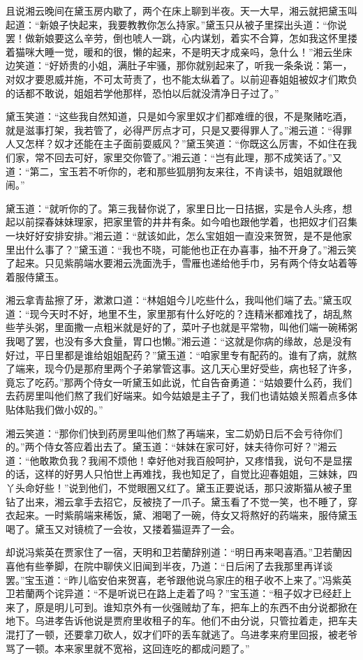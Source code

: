 \documentclass[12pt,oneside]{book}
\begin{document}
且说湘云晚间在黛玉房内歇了，两个在床上聊到半夜。天一大早，湘云就把黛玉叫起道：“新娘子快起来，我要教教你怎么持家。”黛玉只从被子里探出头道：“你说罢！做新娘要这么辛劳，倒也唬人一跳，心内谋划，着实不合算，怎如我这怀里搂着猫咪大睡一觉，暖和的很，懒的起来，不是明天才成亲吗，急什么！”湘云坐床边笑道：“好娇贵的小姐，满肚子牢骚，那你就别起来了，听我一条条说：第一，对奴才要恩威并施，不可太苛责了，也不能太纵着了。以前迎春姐姐被奴才们欺负的话都不敢说，姐姐若学他那样，恐怕以后就没清净日子过了。”

黛玉笑道：“这些我自然知道，只是如今家里奴才们都难缠的很，不是聚赌吃酒，就是滋事打架，我若管了，必得严厉点才可，只是又要得罪人了。”湘云道：“得罪人又怎样？奴才还能在主子面前耍威风？”黛玉笑道：“你既这么厉害，不如住在我们家，常不回去可好，家里交你管了。”湘云道：“岂有此理，那不成笑话了。”又道：“第二，宝玉若不听你的，老和那些狐朋狗友来往，不肯读书，姐姐就跟他闹。”

黛玉道：“就听你的了。第三我替你说了，家里日比一日拮据，实是令人头疼，想起以前探春妹妹理家，把家里管的井井有条。如今咱也跟他学着，也把奴才们召集一块好好安排安排。”湘云道：“就该如此，怎么宝姐姐一直没来贺贺，是不是他家里出什么事了？”黛玉道：“我也不晓，可能他也正在办喜事，抽不开身了。”湘云笑了起来。只见紫鹃端水要湘云洗面洗手，雪雁也递给他手巾，另有两个侍女站着等着服侍黛玉。

湘云拿青盐擦了牙，漱漱口道：“林姐姐今儿吃些什么，我叫他们端了去。”黛玉叹道：“现今天时不好，地里不生，家里那有什么好吃的？连精米都难找了，胡乱熬些芋头粥，里面撒一点粗米就是好的了，菜叶子也就是平常物，叫他们端一碗稀粥我喝了罢，也没有多大食量，胃口也懒。”湘云道：“这就是你病的缘故，总是没有好过，平日里都是谁给姐姐配药？”黛玉道：“咱家里专有配药的。谁有了病，就熬了端来，现今仍是那府里两个子弟掌管这事。这几天心里好受些，病也轻了许多，竟忘了吃药。”那两个侍女一听黛玉如此说，忙自告奋勇道：“姑娘要什么药，我们去药房里叫他们熬了我们好端来。如今姑娘是主子了，我们也请姑娘关照着点多体贴体贴我们做小奴的。”

湘云笑道：“那你们快到药房里叫他们熬了再端来，宝二奶奶日后不会亏待你们的。”两个侍女答应着出去了。黛玉道：“妹妹在家可好，妹夫待你可好？”湘云道：“他敢欺负我？我闹不烦他！幸好他对我百般呵护，又疼惜我，说句不是显摆的话，这样的好男人只怕世上再难找，我也知足了，自觉比迎春姐姐，三妹妹，四丫头命好些！”说到他们，不觉眼圈又红了。黛玉正要说话，那只波斯猫从被子里钻了出来，湘云拿手去招它，反被挠了一爪子。黛玉看了不觉一笑，也不睡了，穿衣起来。一时紫鹃端来稀饭，黛、湘喝了一碗，侍女又将熬好的药端来，服侍黛玉喝了。黛玉又对镜梳了一会妆，又搂着猫逗弄了一会。

却说冯紫英在贾家住了一宿，天明和卫若蘭辞别道：“明日再来喝喜酒。”卫若蘭因喜他有些拳脚，在院中聊侠义旧闻到半夜，乃道：“日后闲了去我那里再详谈罢。”宝玉道：“昨儿临安伯来贺喜，老爷跟他说乌家庄的租子收不上来了。”冯紫英卫若蘭两个诧异道：“不是听说已在路上走着了吗？”宝玉道：“租子奴才已经赶上来了，原是明儿可到。谁知京外有一伙强贼劫了车，把车上的东西不由分说都掀在地下。乌进孝告诉他说是贾府里收租子的车。他们不由分说，只管拉着走，把车夫混打了一顿，还要拿刀砍人，奴才们吓的丢车就逃了。乌进孝来府里回报，被老爷骂了一顿。本来家里就不宽裕，这回连吃的都成问题了。”
\end{document}
